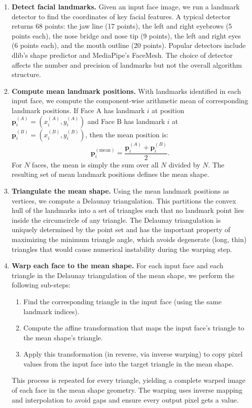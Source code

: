 \begin{enumerate}
    \item \textbf{Detect facial landmarks.} Given an input face image, we run a landmark detector
    to find the coordinates of key facial features. A typical detector returns 68 points: the jaw
    line (17 points), the left and right eyebrows (5 points each), the nose bridge and nose tip (9
    points), the left and right eyes (6 points each), and the mouth outline (20 points). Popular
    detectors include dlib's shape predictor and MediaPipe's FaceMesh. The choice of detector
    affects the number and precision of landmarks but not the overall algorithm structure.

    \item \textbf{Compute mean landmark positions.} With landmarks identified in each input face,
    we compute the component-wise arithmetic mean of corresponding landmark positions. If Face A
    has landmark $i$ at position $\mathbf{p}^{(A)}_i = (x^{(A)}_i, y^{(A)}_i)$ and Face B
    has landmark $i$ at $\mathbf{p}^{(B)}_i = (x^{(B)}_i, y^{(B)}_i)$, then the mean position is:
    \[
        \mathbf{p}^{(\text{mean})}_i = \frac{\mathbf{p}^{(A)}_i + \mathbf{p}^{(B)}_i}{2}.
    \]
    For $N$ faces, the mean is simply the sum over all $N$ divided by $N$. The resulting set of
    mean landmark positions defines the mean shape.

    \item \textbf{Triangulate the mean shape.} Using the mean landmark positions as vertices, we
    compute a Delaunay triangulation. This partitions the convex hull of the landmarks into a set
    of triangles such that no landmark point lies inside the circumcircle of any triangle. The
    Delaunay triangulation is uniquely determined by the point set and has the important property
    of maximizing the minimum triangle angle, which avoids degenerate (long, thin) triangles that
    would cause numerical instability during the warping step.

    \item \textbf{Warp each face to the mean shape.} For each input face and each triangle in the
    Delaunay triangulation of the mean shape, we perform the following sub-steps:
    \begin{enumerate}
        \item[a.] Find the corresponding triangle in the input face (using the same landmark
        indices).
        \item[b.] Compute the affine transformation that maps the input face's triangle to the
        mean shape's triangle.
        \item[c.] Apply this transformation (in reverse, via inverse warping) to copy pixel values
        from the input face into the target triangle in the mean shape.
    \end{enumerate}
    This process is repeated for every triangle, yielding a complete warped image of each face in
    the mean shape geometry. The warping uses inverse mapping and interpolation to avoid gaps and
    ensure every output pixel gets a value.


\end{enumerate}
